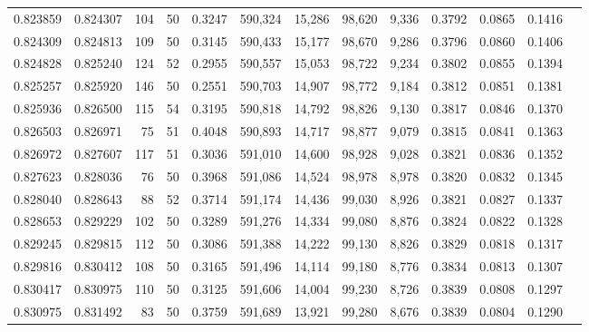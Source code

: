 \begin{tabular}{rrrrrrrrrrrrr}
0.823859 & 0.824307 &   104 &  50 &                                     0.3247 & 590,324 &  15,286 &  98,620 &   9,336 & 0.3792 & 0.0865 & 0.1416 \\
0.824309 & 0.824813 &   109 &  50 &                                     0.3145 & 590,433 &  15,177 &  98,670 &   9,286 & 0.3796 & 0.0860 & 0.1406 \\
0.824828 & 0.825240 &   124 &  52 &                                     0.2955 & 590,557 &  15,053 &  98,722 &   9,234 & 0.3802 & 0.0855 & 0.1394 \\
0.825257 & 0.825920 &   146 &  50 &                                     0.2551 & 590,703 &  14,907 &  98,772 &   9,184 & 0.3812 & 0.0851 & 0.1381 \\
0.825936 & 0.826500 &   115 &  54 &                                     0.3195 & 590,818 &  14,792 &  98,826 &   9,130 & 0.3817 & 0.0846 & 0.1370 \\
0.826503 & 0.826971 &    75 &  51 &                                     0.4048 & 590,893 &  14,717 &  98,877 &   9,079 & 0.3815 & 0.0841 & 0.1363 \\
0.826972 & 0.827607 &   117 &  51 &                                     0.3036 & 591,010 &  14,600 &  98,928 &   9,028 & 0.3821 & 0.0836 & 0.1352 \\
0.827623 & 0.828036 &    76 &  50 &                                     0.3968 & 591,086 &  14,524 &  98,978 &   8,978 & 0.3820 & 0.0832 & 0.1345 \\
0.828040 & 0.828643 &    88 &  52 &                                     0.3714 & 591,174 &  14,436 &  99,030 &   8,926 & 0.3821 & 0.0827 & 0.1337 \\
0.828653 & 0.829229 &   102 &  50 &                                     0.3289 & 591,276 &  14,334 &  99,080 &   8,876 & 0.3824 & 0.0822 & 0.1328 \\
0.829245 & 0.829815 &   112 &  50 &                                     0.3086 & 591,388 &  14,222 &  99,130 &   8,826 & 0.3829 & 0.0818 & 0.1317 \\
0.829816 & 0.830412 &   108 &  50 &                                     0.3165 & 591,496 &  14,114 &  99,180 &   8,776 & 0.3834 & 0.0813 & 0.1307 \\
0.830417 & 0.830975 &   110 &  50 &                                     0.3125 & 591,606 &  14,004 &  99,230 &   8,726 & 0.3839 & 0.0808 & 0.1297 \\
0.830975 & 0.831492 &    83 &  50 &                                     0.3759 & 591,689 &  13,921 &  99,280 &   8,676 & 0.3839 & 0.0804 & 0.1290 \\

\end{tabular}

